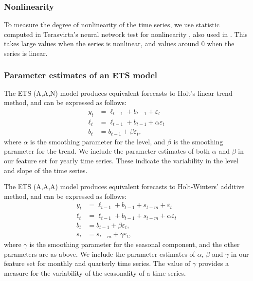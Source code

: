 \documentclass[11pt,a4paper,]{article}
\begin{document}
\hypertarget{nonlinearity}{%
\subsubsection*{Nonlinearity}\label{nonlinearity}}

To measure the degree of nonlinearity of the time series, we use statistic computed in Terasvirta's neural network test for nonlinearity \autocite{nonlintest}, also used in \textcite{wang2009rule}. This takes large values when the series is nonlinear, and values around 0 when the series is linear.

\hypertarget{parameter-estimates-of-an-ets-model}{%
\subsubsection*{Parameter estimates of an ETS model}\label{parameter-estimates-of-an-ets-model}}

The ETS (A,A,N) model \autocite{expsmooth08} produces equivalent forecasts to Holt's linear trend method, and can be expressed as follows:
\begin{align*}
  y_t    & = \ell_{t-1}+b_{t-1}+\varepsilon_t\\
  \ell_t & = \ell_{t-1}+b_{t-1}+\alpha \varepsilon_t\\
  b_t    & = b_{t-1}+\beta \varepsilon_t,
\end{align*}
where \(\alpha\) is the smoothing parameter for the level, and \(\beta\) is the smoothing parameter for the trend. We include the parameter estimates of both \(\alpha\) and \(\beta\) in our feature set for yearly time series. These indicate the variability in the level and slope of the time series.

The ETS (A,A,A) model \autocite{expsmooth08} produces equivalent forecasts to Holt-Winters' additive method, and can be expressed as follows:
\begin{align*}
  y_t    & = \ell_{t-1}+b_{t-1}+s_{t-m}+\varepsilon_t\\
  \ell_t & = \ell_{t-1}+b_{t-1}+s_{t-m}+\alpha \varepsilon_t\\
  b_t    & = b_{t-1}+\beta \varepsilon_t,\\
  s_t &= s_{t-m} + \gamma\varepsilon_t,
\end{align*}
where \(\gamma\) is the smoothing parameter for the seasonal component, and the other parameters are as above. We include the parameter estimates of \(\alpha\), \(\beta\) and \(\gamma\) in our feature set for monthly and quarterly time series. The value of \(\gamma\) provides a measure for the variability of the seasonality of a time series.
\end{document}
